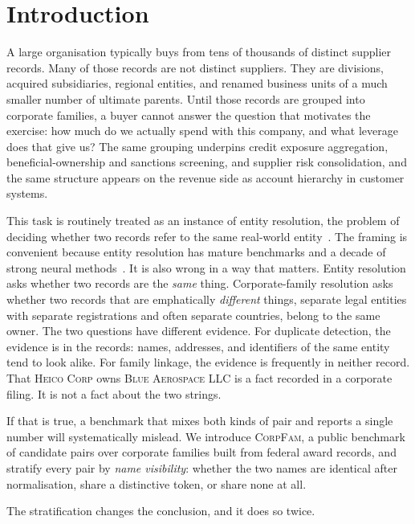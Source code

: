 \section{Introduction}

A large organisation typically buys from tens of thousands of distinct supplier
records. Many of those records are not distinct suppliers. They are divisions, acquired
subsidiaries, regional entities, and renamed business units of a much smaller number of
ultimate parents. Until those records are grouped into corporate families, a buyer
cannot answer the question that motivates the exercise: how much do we actually spend
with this company, and what leverage does that give us? The same grouping underpins
credit exposure aggregation, beneficial-ownership and sanctions screening, and supplier
risk consolidation, and the same structure appears on the revenue side as account
hierarchy in customer systems.

This task is routinely treated as an instance of entity resolution, the problem of
deciding whether two records refer to the same real-world
entity~\citep{papadakis2021fourgenerations,barlaug2021survey}. The framing is convenient
because entity resolution has mature benchmarks and a decade of strong neural
methods~\citep{mudgal2018deepmatcher,li2020ditto,peeters2025entitymatchingllm}. It is also wrong
in a way that matters. Entity resolution asks whether two records are the \emph{same}
thing. Corporate-family resolution asks whether two records that are emphatically
\emph{different} things, separate legal entities with separate registrations and often
separate countries, belong to the same owner. The two questions have different
evidence. For duplicate detection, the evidence is in the records: names, addresses,
and identifiers of the same entity tend to look alike. For family linkage, the evidence
is frequently in neither record. That \textsc{Heico Corp} owns \textsc{Blue Aerospace
LLC} is a fact recorded in a corporate filing. It is not a fact about the two strings.

If that is true, a benchmark that mixes both kinds of pair and reports a single number
will systematically mislead. We introduce \textsc{CorpFam}, a public benchmark of
\BenchPairs candidate pairs over \BenchFamilies corporate families built from
\ArchiveRows federal award records, and stratify every pair by \emph{name visibility}:
whether the two names are identical after normalisation, share a distinctive token, or
share none at all.

The stratification changes the conclusion, and it does so twice.

